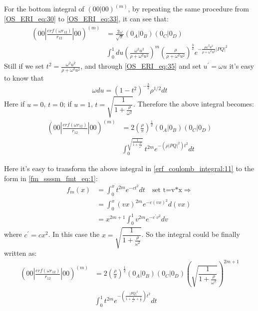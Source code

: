 For the bottom integral of $(00|00)^{(m)}$, by repeating the same procedure from 
\ref{OS_ERI_eq:30} to \ref{OS_ERI_eq:33}, it can see that:
\begin{equation}
 \begin{split}
 (00|\frac{erf(\omega r_{12})}{r_{12}}|00)^{(m)} &=\frac{2\omega}{\sqrt{\pi}}(0_{A}|0_{B})(0_{C}|0_{D}) \\
 &\int_{0}^{1} du \left( \frac{\omega^{2}u^{2}}{\rho+\omega^{2}u^{2}}\right)^{m}
 \left(\frac{\rho}{\rho+\omega^{2}u^{2}}\right)^{\frac{3}{2}}
 e^{-\frac{\rho \omega^{2}u^{2}}{\rho+ \omega^{2}u^{2}}|PQ|^{2}} 
 \end{split}
\label{erf_coulomb_integral:10}
\end{equation}
Still if we set $t^{2} = \frac{\omega^{2}u^{2}}{\rho+ \omega^{2}u^{2}}$, and through 
\ref{OS_ERI_eq:35} and set $u^{'} = \omega u$ it's easy to know that 
\begin{equation}
 \omega du = (1-t^{2})^{-\frac{3}{2}}\rho^{1/2} dt
\end{equation}
Here if $u=0$, $t = 0$; if $u = 1$, $t = \sqrt{\dfrac{1}{1+\frac{\rho}{\omega^{2}}}}$. Therefore
the above integral becomes:
\begin{equation}
 \begin{split}
 (00|\frac{erf(\omega r_{12})}{r_{12}}|00)^{(m)} &= 
 2\left( \frac{\rho}{\pi}\right)^{\frac{1}{2}}(0_{A}|0_{B})(0_{C}|0_{D}) \\
 &\int^{\sqrt{\frac{1}{1+\frac{\rho}{\omega^{2}}}}}_{0} t^{2m} e^{-(\rho|PQ|^{2})t^{2}} dt 
 \end{split}
\label{erf_coulomb_integral:11}
\end{equation}

Here it's easy to transform the above integral in \ref{erf_coulomb_integral:11}
to the form in \ref{fm_ssssm_fmt_eq:1}:
\begin{equation}
 \begin{split}
  f_{m}(x) &= \int^{x}_{0} t^{2m} e^{-ct^{2}} dt \quad \text{set t=v*x} \Rightarrow\\
           &= \int^{x}_{0} (vx)^{2m} e^{-c(vx)^{2}} d(vx) \\
           &= x^{2m+1} \int_{0}^{1} v^{2m} e^{-c^{'}v^{2}} dv
 \end{split}
 \label{erf_coulomb_integral:12}
\end{equation}
where $c^{'} = cx^{2}$. In this case the $x = \sqrt{\dfrac{1}{1+\frac{\rho}{\omega^{2}}}}$. So the integral
could be finally written as:
\begin{equation}
 \begin{split}
 (00|\frac{erf(\omega r_{12})}{r_{12}}|00)^{(m)} &= 
 2\left( \frac{\rho}{\pi}\right)^{\frac{1}{2}}(0_{A}|0_{B})(0_{C}|0_{D})
 \left( \sqrt{\dfrac{1}{1+\frac{\rho}{\omega^{2}}}}\right)^{2m+1}  \\
 &\int^{1}_{0} t^{2m} e^{-\left( \frac{|PQ|^{2}}{1+\frac{1}{\omega^{2}} + 
 \frac{1}{\rho}}\right) t^{2}} dt 
 \end{split}
\label{erf_coulomb_integral:13}
\end{equation}
